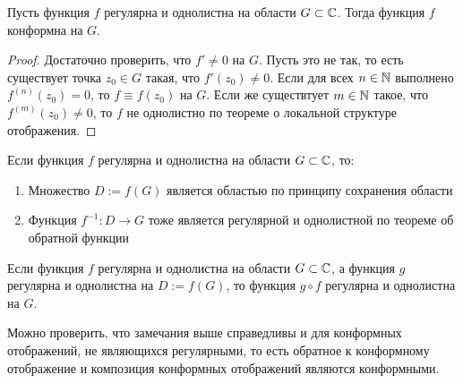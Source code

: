 \begin{proposition}
	Пусть функция $f$ регулярна и однолистна на области $G \subset \mathbb{C}$. Тогда функция $f$ конформна на $G$.
\end{proposition}

\begin{proof}
	Достаточно проверить, что $f' \ne 0$ на $G$. Пусть это не так, то есть существует точка $z_0 \in G$ такая, что $f'(z_0) \ne 0$. Если для всех $n \in \mathbb{N}$ выполнено $f^{(n)}(z_0) = 0$, то $f \equiv f(z_0)$ на $G$. Если же существтует $m \in \mathbb{N}$ такое, что $f^{(m)}(z_0) \ne 0$, то $f$ не однолистно по теореме о локальной структуре отображения.
\end{proof}

\begin{note}
	Если функция $f$ регулярна и однолистна на области $G \subset \mathbb{C}$, то:
	\begin{enumerate}
		\item Множество $D := f(G)$ является областью по принципу сохранения области
		\item Функция $f^{-1} : D \to G$ тоже является регулярной и однолистной по теореме об обратной функции
	\end{enumerate}
\end{note}

\pagebreak
\begin{note}
	Если функция $f$ регулярна и однолистна на области $G \subset \mathbb{C}$, а функция $g$ регулярна и однолистна на $D := f(G)$, то функция $g \circ f$ регулярна и однолистна на $G$.
\end{note}

\begin{note}
	Можно проверить, что замечания выше справедливы и для конформных отображений, не являющихся регулярными, то есть обратное к конформному отображение и композиция конформных отображений являются конформными.
\end{note}

